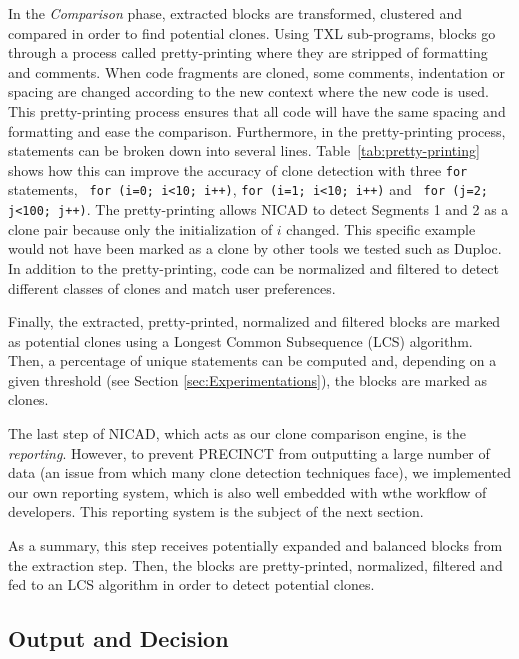 \documentclass[conference]{IEEEtran}
\begin{document}
In the \textit{Comparison} phase, extracted blocks are transformed, clustered and compared in order to find potential clones.
Using TXL sub-programs, blocks go through a process called pretty-printing where they are stripped of formatting and comments.
When code fragments are cloned, some comments, indentation or spacing are changed according to the new context where the new code is used. This pretty-printing process ensures that all code will have the same spacing and formatting and ease the comparison.
Furthermore, in the pretty-printing process, statements can be broken down into several lines.
Table~\ref{tab:pretty-printing} shows how this can improve the accuracy of clone detection with three \texttt{for} statements, \texttt{ for (i=0; i<10; i++)}, \texttt{for (i=1; i<10; i++)} and \texttt{ for (j=2; j<100; j++)}.
The pretty-printing allows NICAD to detect Segments 1 and 2 as a clone pair because only the initialization of $i$ changed.
This specific example would not have been marked as a clone by other  tools we tested such as Duploc\cite{Ducasse1999}.
In addition to the pretty-printing, code can be normalized and filtered to detect different classes of clones and match user preferences.



Finally, the extracted, pretty-printed, normalized and filtered blocks are marked as potential clones using a Longest Common Subsequence (LCS) algorithm\cite{Hunt1977}. Then, a percentage of unique statements can be computed and, depending on a given threshold (see Section \ref{sec:Experimentations}), the blocks are marked as clones.

The last step of NICAD, which acts as our clone comparison engine, is the \textit{reporting}. However, to prevent PRECINCT from outputting  a large number of data (an issue from which many clone detection techniques face), we  implemented our own reporting system, which is also well embedded with wthe workflow of developers. This reporting system is the subject of the next section.

As a summary, this step receives potentially expanded and balanced blocks from the extraction step.
Then, the blocks are pretty-printed, normalized, filtered and fed to an LCS algorithm in order to detect potential clones.

\subsection{Output and Decision}
\label{sub:Output and Decision}
\end{document}
